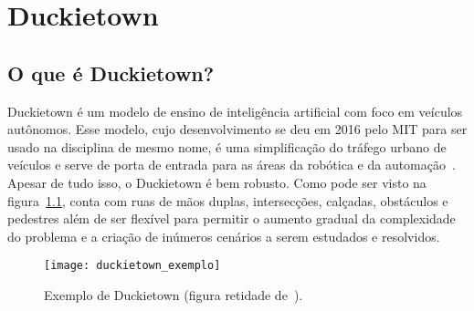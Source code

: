 

\chapter{Duckietown}
\label{cap:duckietown}

\section{O que é Duckietown?}
\label{sec:o-que-e-duckietown}

\enlargethispage{.5\baselineskip}

Duckietown é um modelo de ensino de inteligência artificial com foco em veículos autônomos. Esse modelo, cujo desenvolvimento se deu em 2016 pelo MIT para ser usado na disciplina de mesmo nome, é uma simplificação do tráfego urbano de veículos e serve de porta de entrada para as áreas da robótica e da automação~\citep{duckietown-historia}. Apesar de tudo isso, o Duckietown é bem robusto. Como pode ser visto na figura~\ref{fig:duckietown_exemplo}, conta com ruas de mãos duplas, intersecções, calçadas, obstáculos e pedestres além de ser flexível para permitir o aumento gradual da complexidade do problema e a criação de inúmeros cenários a serem estudados e resolvidos.

\begin{figure}
	\centering
	\texttt{[image: duckietown\_exemplo]}
	\caption{Exemplo de Duckietown (figura retidade de~\citep{duckietown-guia}).\label{fig:duckietown_exemplo}}
\end{figure}

